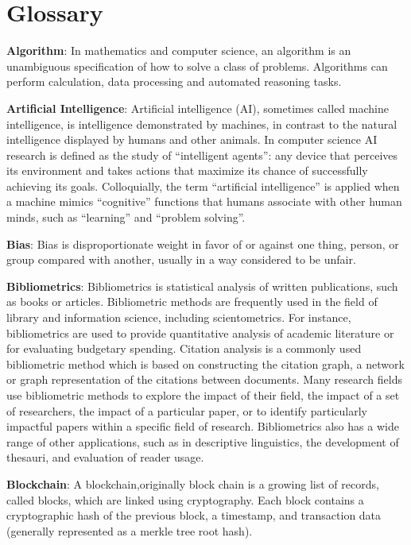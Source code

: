 \documentclass[]{book}
\theoremstyle{definition}
\theoremstyle{definition}
\theoremstyle{definition}
\theoremstyle{remark}
\begin{document}
\chapter*{Glossary}\label{glossary}

\textbf{Algorithm}: In mathematics and computer science, an algorithm is
an unambiguous specification of how to solve a class of problems.
Algorithms can perform calculation, data processing and automated
reasoning tasks.

\textbf{Artificial Intelligence}: Artificial intelligence (AI),
sometimes called machine intelligence, is intelligence demonstrated by
machines, in contrast to the natural intelligence displayed by humans
and other animals. In computer science AI research is defined as the
study of ``intelligent agents'': any device that perceives its
environment and takes actions that maximize its chance of successfully
achieving its goals. Colloquially, the term ``artificial intelligence''
is applied when a machine mimics ``cognitive'' functions that humans
associate with other human minds, such as ``learning'' and ``problem
solving''.

\textbf{Bias}: Bias is disproportionate weight in favor of or against
one thing, person, or group compared with another, usually in a way
considered to be unfair.

\textbf{Bibliometrics}: Bibliometrics is statistical analysis of written
publications, such as books or articles. Bibliometric methods are
frequently used in the field of library and information science,
including scientometrics. For instance, bibliometrics are used to
provide quantitative analysis of academic literature or for evaluating
budgetary spending. Citation analysis is a commonly used bibliometric
method which is based on constructing the citation graph, a network or
graph representation of the citations between documents. Many research
fields use bibliometric methods to explore the impact of their field,
the impact of a set of researchers, the impact of a particular paper, or
to identify particularly impactful papers within a specific field of
research. Bibliometrics also has a wide range of other applications,
such as in descriptive linguistics, the development of thesauri, and
evaluation of reader usage.

\textbf{Blockchain}: A blockchain,originally block chain is a growing
list of records, called blocks, which are linked using cryptography.
Each block contains a cryptographic hash of the previous block, a
timestamp, and transaction data (generally represented as a merkle tree
root hash).
\end{document}
